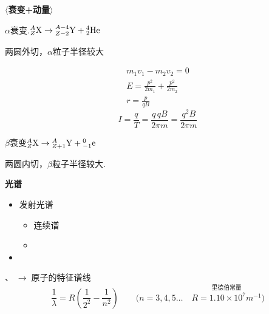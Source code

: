 \textbf{$\langle$衰变+动量$\rangle$} %

\noindent $\alpha$衰变.\quad ${}^{A}_{Z}\mathrm{X}\to{}^{A-4}_{Z-2}\mathrm{Y}+{}^{4}_{2}\mathrm{He}$\quad {} %

两圆外切，$\alpha$粒子半径较大

\begin{gather*}
m_1v_1-m_2v_2=0\\
E=\frac{p^2}{2m_1}+\frac{p^2}{2m_2}\\
r=\frac{p}{qB}
\end{gather*}
\[
I=\frac{q}{T}=\frac{q\,qB}{2\pi m}=\frac{q^2B}{2\pi m}
\]

\noindent $\beta$衰变\quad ${}^{A}_{Z}\mathrm{X}\to{}^{A}_{Z+1}\mathrm{Y}+{}^{0}_{-1}\mathrm{e}$\quad {} %

两圆内切，$\beta$粒子半径较大.

\textbf{光谱}
\begin{itemize}
\item 发射光谱
  \begin{itemize}
  \item 连续谱
  \item {}
  \end{itemize}
\item {}
\end{itemize}
\noindent {}、$\;\to\;$原子的特征谱线 %
\[
\frac{1}{\lambda}=R\left(\frac{1}{2^2}-\frac{1}{n^2}\right)\qquad\bigl(n=3,4,5\ldots\quad \overset{\text{里德伯常量}}{R=1.10\times10^{7}\unit{m^{-1}}}\bigr)
\] %
